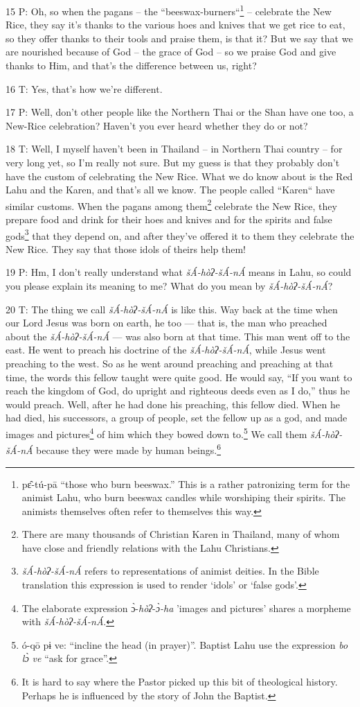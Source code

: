 15 P: Oh, so when the pagans -- the ``beeswax-burners``\footnote{pɛ̂-tú-pā ``those who burn beeswax.'' This is a rather patronizing term for the animist Lahu, who burn beeswax candles while worshiping their spirits. The animists themselves often refer to themselves this way.} --
celebrate the New Rice, they say it's thanks to the various hoes and knives that
we get rice to eat, so they offer thanks to their tools and praise them, is that
it? But we say that we are nourished because of God -- the grace of God -- so we
praise God and give thanks to Him, and that's the difference between us, right?

16 T: Yes, that's how we're different.

17 P: Well, don't other people like the Northern Thai or the Shan have one too,
a New-Rice celebration? Haven't you ever heard whether they do or not?

18 T: Well, I myself haven't been in Thailand -- in Northern Thai country -- for
very long yet, so I'm really not sure. But my guess is that they probably don't
have the custom of celebrating the New Rice. What we do know about is the Red Lahu
and the Karen, and that's all we know. The people called ``Karen``
have similar customs. When the pagans among them\footnote{There are many thousands of Christian Karen in Thailand, many of whom have close and friendly relations with the Lahu Christians.} celebrate the New Rice, they
prepare food and drink for their hoes and knives and for the spirits and false
gods\footnote{\textit{šÁ-hòʔ-šÁ-nÁ} refers to representations of animist deities. In the Bible translation this expression is used to render `idols' or `false gods'.} that they depend on, and after they've offered it to them they celebrate
the New Rice. They say that those idols of theirs help them!

19 P: Hm, I don't really understand what \textit{šÁ-hòʔ-šÁ-nÁ} means in
Lahu, so could you please explain its meaning to me? What do you mean by \textit{šÁ-hòʔ-šÁ-nÁ}?

20 T: The thing we call \textit{šÁ-hòʔ-šÁ-nÁ }is like this. Way back at
the time when our Lord Jesus was born on earth, he too --- that is, the man who
preached about the \textit{šÁ-hòʔ-šÁ-nÁ} --- was also born at that time.
This man went off to the east. He went to preach his doctrine of the \textit{šÁ-hòʔ-šÁ-nÁ},
while Jesus went preaching to the west. So as he went around preaching and preaching
at that time, the words this fellow taught were quite good. He would say, ``If
you want to reach the kingdom of God, do upright and righteous deeds even as I
do,'' thus he would preach. Well, after he had done his preaching, this fellow
died. When he had died, his successors, a group of people, set the fellow up as
a god, and made images and pictures\footnote{The elaborate expression ɔ̀-\textit{hòʔ}-\textit{ɔ̀-ha} 'images and pictures' shares a morpheme with \textit{šÁ-hòʔ-šÁ-nÁ}.} of him which they bowed down to.\footnote{ó-qō pɨ ve: ``incline the head (in prayer)''. Baptist Lahu use the expression \textit{bo lɔ̀ ve} ``ask for grace''.} We
call them \textit{šÁ-hòʔ-šÁ-nÁ} because they were made by human beings.\footnote{It is hard to say where the Pastor picked up this bit of theological history. Perhaps he is influenced by the story of John the Baptist.}

